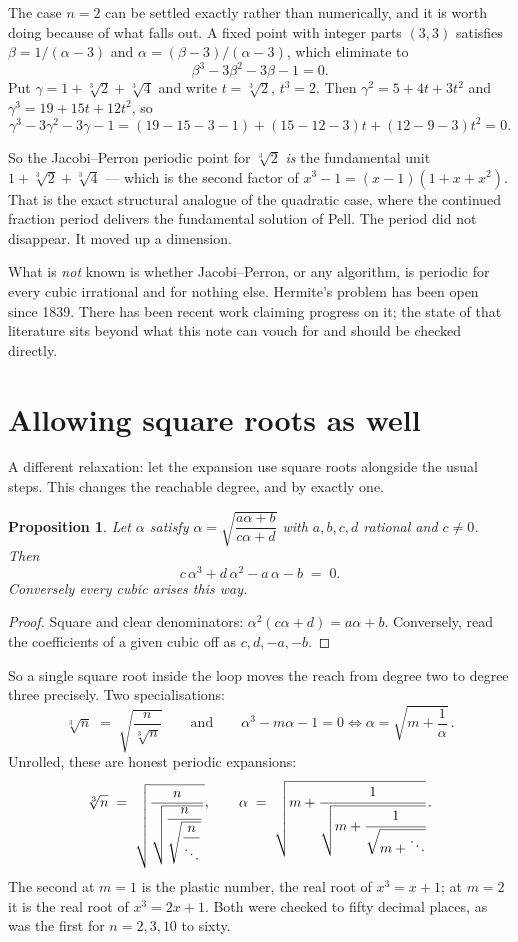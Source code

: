 \documentclass[12pt,a4paper]{article}
\theoremstyle{plain}
\newtheorem{proposition}[theorem]{Proposition}
\theoremstyle{definition}
\begin{document}
The case $n=2$ can be settled exactly rather than numerically, and it is worth doing because of what falls out. A fixed point with integer parts $(3,3)$ satisfies $\beta = 1/(\alpha-3)$ and $\alpha = (\beta-3)/(\alpha-3)$, which eliminate to
\[
  \beta^3 - 3\beta^2 - 3\beta - 1 = 0 .
\]
Put $\gamma = 1 + \sqrt[3]{2} + \sqrt[3]{4}$ and write $t = \sqrt[3]{2}$, $t^3 = 2$. Then $\gamma^2 = 5 + 4t + 3t^2$ and $\gamma^3 = 19 + 15t + 12t^2$, so
\[
  \gamma^3 - 3\gamma^2 - 3\gamma - 1
  = (19-15-3-1) + (15-12-3)t + (12-9-3)t^2 = 0 .
\]

\begin{tcolorbox}[colback=green!5, colframe=green!40!black, arc=2mm]
So the Jacobi--Perron periodic point for $\sqrt[3]{2}$ \emph{is} the fundamental unit $1+\sqrt[3]{2}+\sqrt[3]{4}$ --- which is the second factor of $x^3-1=(x-1)(1+x+x^2)$. That is the exact structural analogue of the quadratic case, where the continued fraction period delivers the fundamental solution of Pell. The period did not disappear. It moved up a dimension.
\end{tcolorbox}

What is \emph{not} known is whether Jacobi--Perron, or any algorithm, is periodic for every cubic irrational and for nothing else. Hermite's problem has been open since 1839. There has been recent work claiming progress on it; the state of that literature sits beyond what this note can vouch for and should be checked directly.

\section{Allowing square roots as well}

A different relaxation: let the expansion use square roots alongside the usual steps. This changes the reachable degree, and by exactly one.

\begin{proposition}
Let $\alpha$ satisfy $\alpha = \sqrt{\dfrac{a\alpha+b}{c\alpha+d}}$ with $a,b,c,d$ rational and $c \neq 0$. Then
\[
  c\,\alpha^3 + d\,\alpha^2 - a\,\alpha - b \;=\; 0 .
\]
Conversely every cubic arises this way.
\end{proposition}

\begin{proof}
Square and clear denominators: $\alpha^2(c\alpha+d) = a\alpha+b$. Conversely, read the coefficients of a given cubic off as $c,d,-a,-b$.
\end{proof}

So a single square root inside the loop moves the reach from degree two to degree three precisely. Two specialisations:
\[
  \sqrt[3]{n} \;=\; \sqrt{\frac{n}{\sqrt[3]{n}}}
  \qquad\text{and}\qquad
  \alpha^3 - m\alpha - 1 = 0 \iff \alpha = \sqrt{m + \frac1\alpha}\, .
\]
Unrolled, these are honest periodic expansions:
\[
  \sqrt[3]{n} \;=\; \sqrt{\frac{n}{\sqrt{\dfrac{n}{\sqrt{\dfrac{n}{\ddots}}}}}},
  \qquad
  \alpha \;=\; \sqrt{m + \cfrac{1}{\sqrt{m + \cfrac{1}{\sqrt{m+\ddots}}}}}\, .
\]
The second at $m=1$ is the plastic number, the real root of $x^3 = x+1$; at $m=2$ it is the real root of $x^3 = 2x+1$. Both were checked to fifty decimal places, as was the first for $n = 2, 3, 10$ to sixty.
\end{document}
